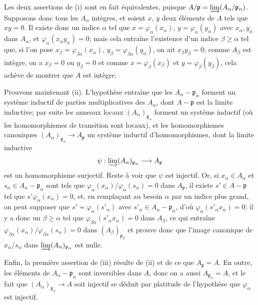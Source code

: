 Les deux assertions de (i) sont en fait équivalentes, puisque
$A/\mathfrak p=\varinjlim(A_\alpha/\mathfrak p_\alpha)$. Supposons donc tous
les $A_\alpha$ intègres, et soient $x$, $y$ deux éléments de $A$ tels que
$xy=0$. Il existe donc un indice $\alpha$ tel que
$x=\varphi_\alpha(x_\alpha)$, $y=\varphi_\alpha(y_\alpha)$ avec
$x_\alpha,y_\alpha$ dans $A_\alpha$, et
$\varphi_\alpha(x_\alpha y_\alpha)=0$; mais cela entraîne l'existence d'un
indice $\beta\geq\alpha$ tel que, si l'on pose
$x_\beta=\varphi_{\beta\alpha}(x_\alpha)$,
$y_\beta=\varphi_{\beta\alpha}(y_\alpha)$, on ait $x_\beta y_\beta=0$; comme
$A_\beta$ est intègre, on a $x_\beta=0$ ou $y_\beta=0$ et comme
$x=\varphi_\beta(x_\beta)$ et $y=\varphi_\beta(y_\beta)$, cela achève de
montrer que $A$ est intègre.

Prouvons maintenant (ii). L'hypothèse entraîne que les
$A_\alpha-\mathfrak p_\alpha$ forment un système inductif de parties
multiplicatives des $A_\alpha$, dont $A-\mathfrak p$ est la limite inductive;
par suite les anneaux locaux $(A_\alpha)_{\mathfrak p_\alpha}$ forment un
système inductif (où les homomorphismes de transition sont locaux), et les
homomorphismes canoniques
$(A_\alpha)_{\mathfrak p_\alpha}\to A_{\mathfrak p}$ un système inductif
d'homomorphismes, dont la limite inductive
\[
\psi:\varinjlim (A_\alpha)_{\mathfrak p_\alpha}
\longrightarrow A_{\mathfrak p}
\]
est un homomorphisme surjectif. Reste à voir que $\psi$ est injectif. Or, si
$x_\alpha\in A_\alpha$ et
$s_\alpha\in A_\alpha-\mathfrak p_\alpha$ sont tels que
$\varphi_\alpha(x_\alpha)/\varphi_\alpha(s_\alpha)=0$ dans $A_{\mathfrak p}$,
il existe $s'\in A-\mathfrak p$ tel que
$s'\varphi_\alpha(x_\alpha)=0$, et, en remplaçant au besoin $\alpha$ par un
indice plus grand, on peut supposer que $s'=\varphi_\alpha(s'_\alpha)$ avec
$s'_\alpha\in A_\alpha-\mathfrak p_\alpha$, d'où
$\varphi_\alpha(s'_\alpha x_\alpha)=0$; il y a donc un $\beta\geq\alpha$ tel
que $\varphi_{\beta\alpha}(s'_\alpha x_\alpha)=0$ dans $A_\beta$, ce qui
entraîne
$\varphi_{\beta\alpha}(x_\alpha)/\varphi_{\beta\alpha}(s_\alpha)=0$ dans
$(A_\beta)_{\mathfrak p_\beta}$ et prouve donc que l'image canonique de
$x_\alpha/s_\alpha$ dans
$\varinjlim(A_\alpha)_{\mathfrak p_\alpha}$ est nulle.

Enfin, la première assertion de (iii) résulte de (ii) et de ce que
$A_{\mathfrak p}=A$. En outre, les éléments de
$A_\alpha-\mathfrak p_\alpha$ sont inversibles dans $A$, donc on a aussi
$A_{\mathfrak p_\alpha}=A$, et le fait que
$(A_\alpha)_{\mathfrak p_\alpha}\to A$ soit injectif se déduit par platitude
de l'hypothèse que $\varphi_\alpha$ est injectif.


